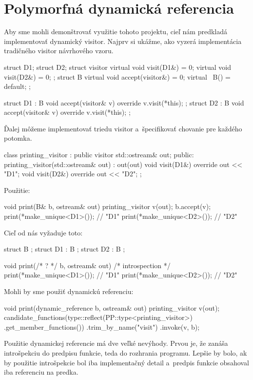 \section{Polymorfná dynamická referencia}

Aby sme mohli demonštrovať využitie tohoto projektu, cieľ nám predkladá implementovať dynamický visitor. Najprv si ukážme, ako vyzerá implementácia tradičného visitor návrhového vzoru.
\begin{code}
struct D1; struct D2;
struct visitor {
    virtual void visit(D1&) = 0;
    virtual void visit(D2&) = 0;
};
struct B {
    virtual void accept(visitor&) = 0;
    virtual ~B() = default;
};

struct D1 : B { void accept(visitor& v) override { v.visit(*this); } };
struct D2 : B { void accept(visitor& v) override { v.visit(*this); } };
\end{code}
Ďalej môžeme implementovať triedu visitor a~špecifikovať chovanie pre každého potomka.
\begin{code}
class printing_visitor : public visitor {
    std::ostream& out;
public:
    printing_visitor(std::ostream& out) : out(out) {}
    void visit(D1&) override { out << "D1\n"; }
    void visit(D2&) override { out << "D2\n"; }
};
\end{code}
Použitie:
\begin{code}[fontsize=\footnotesize]
void print(B& b, ostream& out) { printing_visitor v(out); b.accept(v); }
print(*make_unique<D1>()); // "D1"
print(*make_unique<D2>()); // "D2"
\end{code}

Cieľ od nás vyžaduje toto:
\begin{code}
struct B {};
struct D1 : B {};
struct D2 : B {};

void print(/* ? */ b, ostream& out) { /* introspection */ }
print(*make_unique<D1>()); // "D1"
print(*make_unique<D2>()); // "D2"
\end{code}

Mohli by sme použiť dynamickú referenciu:
\begin{code}
void print(dynamic_reference b, ostream& out)
{   printing_visitor v(out);
    candidate_functions(type::reflect(PP::type<printing_visitor>)
                        .get_member_functions())
    .trim_by_name("visit")
    .invoke({v, b});
}
\end{code}
Použitie dynamickej referencie má dve veľké nevýhody. Prvou je, že zanáša introšpekciu do predpisu funkcie, teda do rozhrania programu. Lepšie by bolo, ak by použitie introšpekcie bol iba implementačný detail a~predpis funkcie obsahoval iba referenciu na predka.

